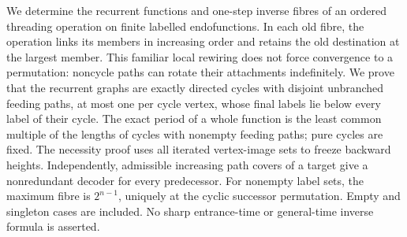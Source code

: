 We determine the recurrent functions and one-step inverse fibres of an
ordered threading operation on finite labelled endofunctions. In each old
fibre, the operation links its members in increasing order and retains
the old destination at the largest member. This familiar local rewiring
does not force convergence to a permutation: noncycle paths can rotate
their attachments indefinitely. We prove that the recurrent graphs are
exactly directed cycles with disjoint unbranched feeding paths, at most
one per cycle vertex, whose final labels lie below every label of their
cycle. The exact period of a whole function is the least common multiple
of the lengths of cycles with nonempty feeding paths; pure cycles are
fixed. The necessity proof uses all iterated vertex-image sets to freeze
backward heights. Independently, admissible increasing path covers of a
target give a nonredundant decoder for every predecessor. For nonempty
label sets, the maximum fibre is $2^{n-1}$, uniquely at the cyclic
successor permutation. Empty and singleton cases are included. No sharp
entrance-time or general-time inverse formula is asserted.
